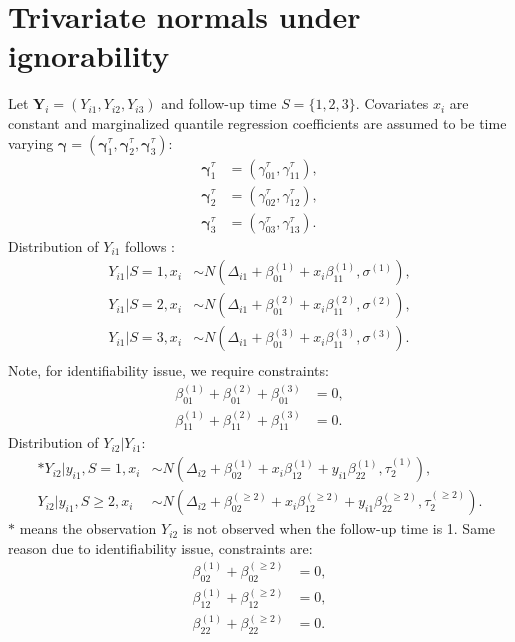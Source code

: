 \documentclass[12pt]{article}
\begin{document}
\section{Trivariate normals under ignorability}
Let $\bm Y_i = (Y_{i1}, Y_{i2}, Y_{i3}) $ and follow-up time $S = \{1,
2, 3\}$. Covariates $x_i$ are constant and marginalized quantile
regression coefficients are assumed to be time varying $\bm \gamma =
(\bm \gamma_1^{\tau}, \bm \gamma_2^{\tau}, \bm \gamma_3^{\tau})$:
\begin{align*}
  \bm \gamma_1^{\tau} & = (\gamma_{01}^{\tau}, \gamma^{\tau}_{11}), \\
  \bm \gamma_{2}^{\tau} & = (\gamma_{02}^{\tau}, \gamma^{\tau}_{12}), \\
  \bm \gamma_{3}^{\tau} & = (\gamma_{03}^{\tau}, \gamma^{\tau}_{13}).
\end{align*}
Distribution of $Y_{i1}$ follows :
\begin{align}
  \label{eq:tri1}
  Y_{i1}| S = 1, x_i & \sim N(\Delta_{i1} + \beta_{01}^{(1)} + x_i\beta_{11}^{(1)}, \sigma^{(1)}), \\
  Y_{i1}| S = 2, x_i & \sim N(\Delta_{i1} + \beta_{01}^{(2)} + x_i\beta_{11}^{(2)}, \sigma^{(2)}), \\
  Y_{i1}| S = 3, x_i & \sim N(\Delta_{i1} + \beta_{01}^{(3)} + x_i\beta_{11}^{(3)}, \sigma^{(3)}). \\
\end{align}
Note, for identifiability issue, we require constraints:
\begin{align}
  \label{eq:constbi1}
  \beta_{01}^{(1)} + \beta_{01}^{(2)} + \beta_{01}^{(3)}  & = 0 ,\\
  \beta_{11}^{(1)} + \beta_{11}^{(2)} + \beta_{11}^{(3)} & = 0 .
\end{align}
Distribution of $Y_{i2} | Y_{i1}$:
\begin{align}
  \label{eq:tri2}
  * Y_{i2} | y_{i1} , S = 1, x_i & \sim N(\Delta_{i2} + \beta_{02}^{(1)} + x_i\beta_{12}^{(1)} + y_{i1}\beta_{22}^{(1)}, \tau_2^{(1)}),  \\
  Y_{i2} | y_{i1} , S \geq 2, x_i & \sim N(\Delta_{i2} + \beta_{02}^{(\geq 2)} +
  x_i\beta_{12}^{(\geq 2)} + y_{i1}\beta_{22}^{(\geq 2)}, \tau_2^{(\geq 2)}).
\end{align}
$*$ means the observation $Y_{i2}$ is not observed when the follow-up
time is 1. Same reason due to identifiability issue, constraints are:
\begin{align}
  \label{eq:constbi2}
  \beta_{02}^{(1)} + \beta_{02}^{(\geq 2)} & = 0 , \\
  \beta_{12}^{(1)} + \beta_{12}^{(\geq 2)} & = 0 , \\
  \beta_{22}^{(1)} + \beta_{22}^{(\geq 2)} & = 0 . \\
\end{align}
\end{document}
